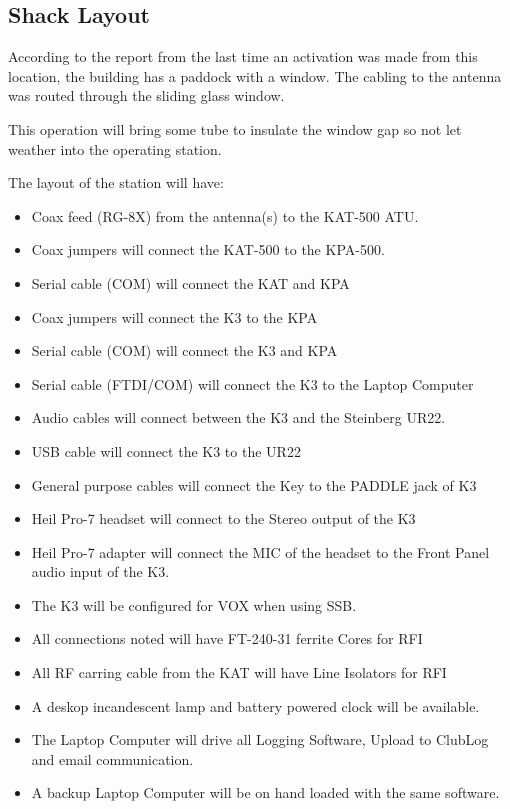 \documentclass[11pt]{article}
\begin{document}
\subsection{Shack Layout}

According to the report from the last time an activation was made
from this location, the building has a paddock with a window.  The cabling
to the antenna was routed through the sliding glass window.  

\par
This operation will bring some tube to insulate the window gap so not let
weather into the operating station.

\par
The layout of the station will have:
\begin{itemize}
\item Coax feed (RG-8X) from the antenna(s) to the KAT-500 ATU.
\item Coax jumpers will connect the KAT-500 to the KPA-500.
\item Serial cable (COM) will connect the KAT and KPA
\item Coax jumpers will connect the K3 to the KPA
\item Serial cable (COM) will connect the K3 and KPA
\item Serial cable (FTDI/COM) will connect the K3 to the Laptop Computer
\item Audio cables will connect between the K3 and the Steinberg UR22.
\item USB cable will connect the K3 to the UR22
\item General purpose cables will connect the Key to the PADDLE jack of K3
\item Heil Pro-7 headset will connect to the Stereo output of the K3
\item Heil Pro-7 adapter will connect the MIC of the headset to the Front 
Panel audio input of the K3.
\item The K3 will be configured for VOX when using SSB.
\item All connections noted will have FT-240-31 ferrite Cores for RFI
\item All RF carring cable from the KAT will have Line Isolators for RFI
\item A deskop incandescent lamp and battery powered clock will be available.
\item The Laptop Computer will drive all Logging Software, Upload to ClubLog 
and email communication.
\item A backup Laptop Computer will be on hand loaded with the same software.

\end{itemize}
\end{document}
